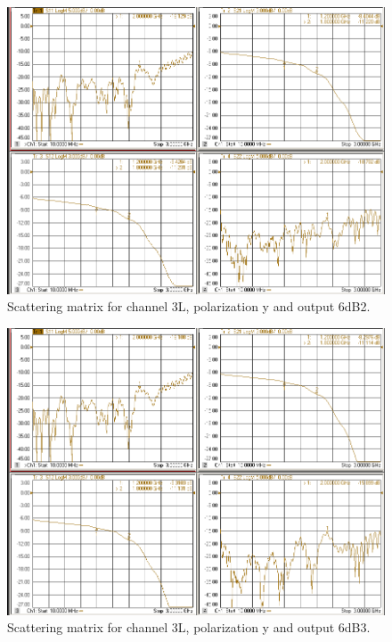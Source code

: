\documentclass[12pt,a4paper,oneside]{article}
\begin{document}
\begin{figure}[H]
\centering
\includegraphics[width=0.9\linewidth]{VNA_results/3Ly_6dB2.png}
\caption{Scattering matrix for channel 3L, polarization y and output 6dB2.}
\label{fig:3Ly_6dB2}
\end{figure}


\begin{figure}[H]
\centering
\includegraphics[width=0.9\linewidth]{VNA_results/3Ly_6dB3.png}
\caption{Scattering matrix for channel 3L, polarization y and output 6dB3.}
\label{fig:3Ly_6dB3}
\end{figure}
\end{document}
